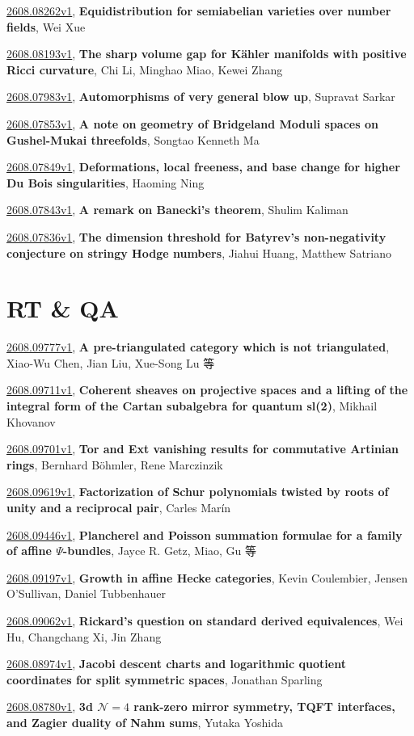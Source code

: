 \documentclass[9pt, a4paper]{article}
\theoremstyle{plain}
\theoremstyle{definition}
\theoremstyle{remark}
\newcommand{\arxiv}[3]{\href{https://arxiv.org/abs/#1}{#1}, \textbf{\textcolor{arxivblue}{#2}}, #3}
\begin{document}
\arxiv{2608.08262v1}{Equidistribution for semiabelian varieties over number fields}{Wei Xue}

\arxiv{2608.08193v1}{The sharp volume gap for Kähler manifolds with positive Ricci curvature}{Chi Li, Minghao Miao, Kewei Zhang}

\arxiv{2608.07983v1}{Automorphisms of very general blow up}{Supravat Sarkar}

\arxiv{2608.07853v1}{A note on geometry of Bridgeland Moduli spaces on Gushel-Mukai threefolds}{Songtao Kenneth Ma}

\arxiv{2608.07849v1}{Deformations, local freeness, and base change for higher Du Bois singularities}{Haoming Ning}

\arxiv{2608.07843v1}{A remark on Banecki's theorem}{Shulim Kaliman}

\arxiv{2608.07836v1}{The dimension threshold for Batyrev's non-negativity conjecture on stringy Hodge numbers}{Jiahui Huang, Matthew Satriano}


\section{RT \& QA}
\arxiv{2608.09777v1}{A pre-triangulated category which is not triangulated}{Xiao-Wu Chen, Jian Liu, Xue-Song Lu 等}

\arxiv{2608.09711v1}{Coherent sheaves on projective spaces and a lifting of the integral form of the Cartan subalgebra for quantum sl(2)}{Mikhail Khovanov}

\arxiv{2608.09701v1}{Tor and Ext vanishing results for commutative Artinian rings}{Bernhard Böhmler, Rene Marczinzik}

\arxiv{2608.09619v1}{Factorization of Schur polynomials twisted by roots of unity and a reciprocal pair}{Carles Marín}

\arxiv{2608.09446v1}{Plancherel and Poisson summation formulae for a family of affine $Ψ$-bundles}{Jayce R. Getz,  Miao,  Gu 等}

\arxiv{2608.09197v1}{Growth in affine Hecke categories}{Kevin Coulembier, Jensen O'Sullivan, Daniel Tubbenhauer}

\arxiv{2608.09062v1}{Rickard's question on standard derived equivalences}{Wei Hu, Changchang Xi, Jin Zhang}

\arxiv{2608.08974v1}{Jacobi descent charts and logarithmic quotient coordinates for split symmetric spaces}{Jonathan Sparling}

\arxiv{2608.08780v1}{3d $\mathcal N=4$ rank-zero mirror symmetry, TQFT interfaces, and Zagier duality of Nahm sums}{Yutaka Yoshida}
\end{document}
